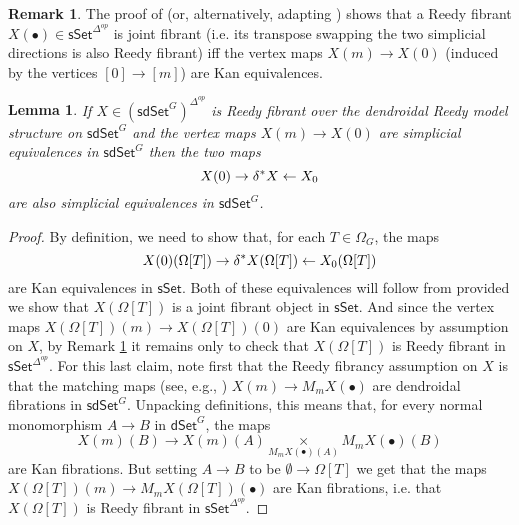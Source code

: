 \documentclass[a4paper,10pt
,draft
]{article}%
\numberwithin{equation}{section}
\numberwithin{figure}{section}
\newtheorem{lemma}[equation]{Lemma}%
\theoremstyle{definition} %
\newtheorem{remark}[equation]{Remark}%
\newcommand{\1}{\ensuremath{\mathbbm 1}}%
\begin{document}
\begin{remark}\label{JOINTFIB REM}
	The proof of \cite[Prop. 4.5(ii)]{BP_edss}
	(or, alternatively, adapting \cite[Prop. 4.24(ii)]{BP_edss})
	shows that a Reedy fibrant $X(\bullet) \in \mathsf{sSet}^{\Delta^{op}}$
	is joint fibrant (i.e. its transpose swapping the two simplicial directions is also Reedy fibrant)
	iff the vertex maps $X(m) \to X(0)$
	(induced by the vertices $[0] \to [m]$)
	are Kan equivalences.
\end{remark}

\begin{lemma}\label{DIAGWE LEM}
If $X \in (\mathsf{sdSet}^G)^{\Delta^{op}}$ is
Reedy fibrant 
over the dendroidal Reedy model structure 
on $\mathsf{sdSet}^G$
and the vertex maps 
$X(m) \to X(0)$ are simplicial equivalences in $\mathsf{sdSet}^G$
then the two maps
\[
X(0) \to \delta^{\**} X \leftarrow X_0
\]
are also simplicial equivalences in $\mathsf{sdSet}^G$.
\end{lemma}

\begin{proof}
By definition,
we need to show that, for each $T \in \Omega_G$, the maps 
\[
	X(0)(\Omega[T]) \to 
	\delta^{\**} X (\Omega[T]) \leftarrow
	X_0 (\Omega[T])
\]	
are Kan equivalences in $\mathsf{sSet}$.
Both of these equivalences will follow from 
\cite[Prop. 4.5(iv)]{BP_edss}
provided we show that
$X(\Omega[T])$ is a joint fibrant object in $\mathsf{sSet}$.
And since the vertex maps 
$X(\Omega[T])(m) \to X(\Omega[T])(0)$
are Kan equivalences by assumption on $X$,
by Remark \ref{JOINTFIB REM} it remains only to check that
$X(\Omega[T])$
is Reedy fibrant in $\mathsf{sSet}^{\Delta^{op}}$.
For this last claim, 
note first that the Reedy fibrancy 
assumption on $X$ is that the matching maps 
(see, e.g., \cite[Thm. A.8]{BP_edss})
$X(m) \to M_m X(\bullet)$
are dendroidal fibrations in 
$\mathsf{sdSet}^G$.
Unpacking definitions,
this means that, for every normal monomorphism 
$A \to B$ in $\mathsf{dSet}^G$, the maps
\[
X(m)(B) \to 
X(m)(A) \underset{{M_m X(\bullet)(A)}}{\times} M_m X(\bullet)(B)
\]
are Kan fibrations.
But setting $A \to B$ to be $\emptyset \to \Omega[T]$
we get that the maps
$X(\Omega[T])(m) \to 
M_m X(\Omega[T])(\bullet)$
are Kan fibrations, i.e. that 
$X(\Omega[T])$ is Reedy fibrant
in $\mathsf{sSet}^{\Delta^{op}}$.
\end{proof}
\end{document}
